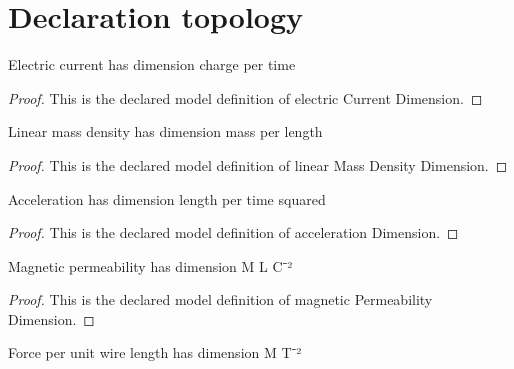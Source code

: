 \section{Declaration topology}
\begin{definition}
  \label{def:physics:phyx-mini-0965:phyxminiproblems-problemphyxmini0965-electriccurrentdimension}
  Electric current has dimension charge per time
\end{definition}
\begin{proof}
  This is the declared model definition of electric Current Dimension.
\end{proof}
\begin{definition}
  \label{def:physics:phyx-mini-0965:phyxminiproblems-problemphyxmini0965-linearmassdensitydimension}
  Linear mass density has dimension mass per length
\end{definition}
\begin{proof}
  This is the declared model definition of linear Mass Density Dimension.
\end{proof}
\begin{definition}
  \label{def:physics:phyx-mini-0965:phyxminiproblems-problemphyxmini0965-accelerationdimension}
  Acceleration has dimension length per time squared
\end{definition}
\begin{proof}
  This is the declared model definition of acceleration Dimension.
\end{proof}
\begin{definition}
  \label{def:physics:phyx-mini-0965:phyxminiproblems-problemphyxmini0965-magneticpermeabilitydimension}
  Magnetic permeability has dimension M L C⁻²
\end{definition}
\begin{proof}
  This is the declared model definition of magnetic Permeability Dimension.
\end{proof}
\begin{definition}
  \label{def:physics:phyx-mini-0965:phyxminiproblems-problemphyxmini0965-forceperlengthdimension}
  Force per unit wire length has dimension M T⁻²
\end{definition}
